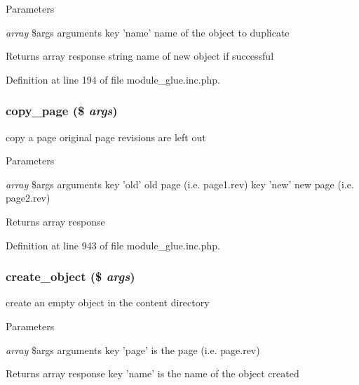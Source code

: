\begin{DoxyParams}{Parameters}
\item[{\em array}]\$args arguments key 'name' name of the object to duplicate \end{DoxyParams}
\begin{DoxyReturn}{Returns}
array response string name of new object if successful 
\end{DoxyReturn}


Definition at line 194 of file module\_\-glue.inc.php.

\hypertarget{module__glue_8inc_8php_a9260da20bb88d89a3beebd98b9194441}{
\subsubsection[{copy\_\-page}]{\setlength{\rightskip}{0pt plus 5cm}copy\_\-page (\$ {\em args})}}
\label{module__glue_8inc_8php_a9260da20bb88d89a3beebd98b9194441}
copy a page original page revisions are left out 
\begin{DoxyParams}{Parameters}
\item[{\em array}]\$args arguments key 'old' old page (i.e. page1.rev) key 'new' new page (i.e. page2.rev) \end{DoxyParams}
\begin{DoxyReturn}{Returns}
array response 
\end{DoxyReturn}


Definition at line 943 of file module\_\-glue.inc.php.

\hypertarget{module__glue_8inc_8php_a12aa18f28f86274d770ba90aa88e2c3e}{
\subsubsection[{create\_\-object}]{\setlength{\rightskip}{0pt plus 5cm}create\_\-object (\$ {\em args})}}
\label{module__glue_8inc_8php_a12aa18f28f86274d770ba90aa88e2c3e}
create an empty object in the content directory


\begin{DoxyParams}{Parameters}
\item[{\em array}]\$args arguments key 'page' is the page (i.e. page.rev) \end{DoxyParams}
\begin{DoxyReturn}{Returns}
array response key 'name' is the name of the object created 
\end{DoxyReturn}


